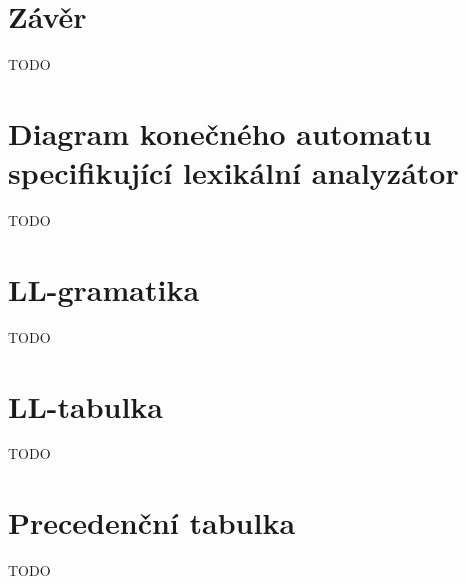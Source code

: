 \documentclass[a4paper, 11pt]{article}
\begin{document}
	\section{Závěr}

	TODO


	\newpage
	
	\renewcommand{\refname}{Literatura}
	


	\newpage
	\appendix

	\section{Diagram konečného automatu specifikující lexikální analyzátor}

	TODO


	\section{LL-gramatika}

	TODO


	\section{LL-tabulka}

	TODO


	\section{Precedenční tabulka}

	TODO
\end{document}
